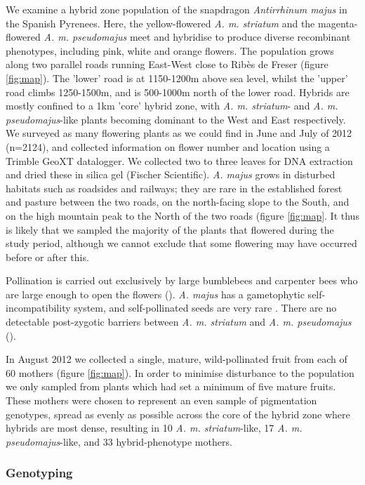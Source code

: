 \documentclass[10pt, a4paper, twocolumn]{article} %
\begin{document}
We examine a hybrid zone population of the snapdragon \textit{Antirrhinum majus} in the Spanish Pyrenees. Here, the yellow-flowered \textit{A. m. striatum} and the magenta-flowered \textit{A. m. pseudomajus} meet and hybridise to produce diverse recombinant phenotypes, including pink, white and orange flowers.
The population grows along two parallel roads running East-West close to Rib\`{e}s de Freser (figure \ref{fig:map}). The ’lower’ road is at 1150-1200m above sea level, whilst the ’upper’ road climbs 1250-1500m, and is 500-1000m north of the lower road. Hybrids are mostly confined to a 1km ’core’ hybrid zone, with \textit{A. m. striatum}- and \textit{A. m. pseudomajus}-like plants becoming dominant to the West and East respectively. We surveyed as many flowering plants as we could find in June and July of 2012 (n=2124), and collected information on flower number and location using a Trimble GeoXT datalogger. We collected two to three leaves for DNA extraction and dried these in silica gel (Fischer Scientific). \textit{A. majus} grows in disturbed habitats such as roadsides and railways; they are rare in the established forest and pasture between the two roads, on the north-facing slope to the South, and on the high mountain peak to the North of the two roads (figure \ref{fig:map}. It thus is likely that we sampled the majority of the plants that flowered during the study period, although we cannot exclude that some flowering may have occurred before or after this. 

Pollination is carried out exclusively by large bumblebees and carpenter bees who are large enough to open the flowers (\cite{vargas2010occluded, andalo2019prevalence}). \textit{A. majus} has a gametophytic self-incompatibility system, and self-pollinated seeds are very rare \parencite{surendranadh2022effects}. There are no detectable post-zygotic barriers between \textit{A. m. striatum} and \textit{A. m. pseudomajus} (\cite{andalo2010post}).

In August 2012 we collected a single, mature, wild-pollinated fruit from each of 60 mothers (figure \ref{fig:map}). In order to minimise disturbance to the population we only sampled from plants which had set a minimum of five mature fruits. These mothers were chosen to represent an even sample of pigmentation genotypes, spread as evenly as possible across the core of the hybrid zone where hybrids are most dense, resulting in 10 \textit{A. m. striatum}-like, 17 \textit{A. m. pseudomajus}-like, and 33 hybrid-phenotype mothers.

\subsubsection{Genotyping}
\end{document}
